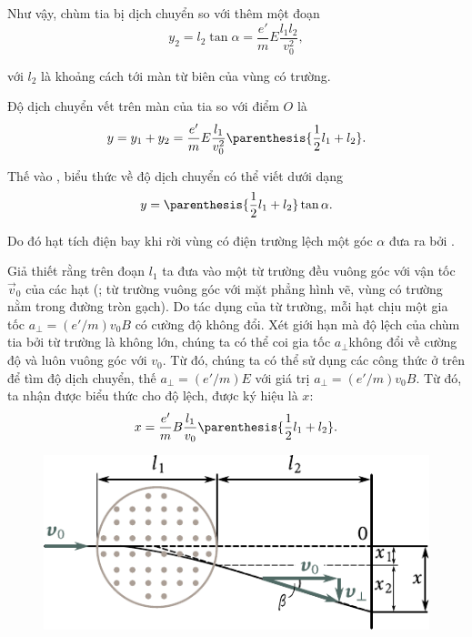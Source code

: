\noindent
Như vậy, chùm tia bị dịch chuyển so với  thêm một đoạn
\begin{equation*}
    y_2 = l_2 \tan\alpha = \frac{e'}{m} E \frac{l_1 l_2}{v_0^2},
\end{equation*}

\noindent
với $l_2$ là khoảng cách tới màn từ biên của vùng có trường.

Độ dịch chuyển vết trên màn của tia so với điểm $O$ là 
\begin{equation}\label{eq:10_7}
    y = y_1 + y_2 = \frac{e'}{m} E \frac{l_1}{v_0^2} \parenthesis{\frac{1}{2} l_1 + l_2}.
\end{equation}

\noindent
Thế vào , biểu thức về độ dịch chuyển có thể viết dưới dạng
\begin{equation*}
    y = \parenthesis{\frac{1}{2} l_1 + l_2} \tan\alpha.
\end{equation*}

\noindent
Do đó hạt tích điện bay khi rời vùng có điện trường lệch một góc $\alpha$ đưa ra bởi  .

Giả thiết rằng trên đoạn $l_1$ ta đưa vào một từ trường đều vuông góc với vận tốc $\vec{v}_0$ của các hạt (; từ trường vuông góc với mặt phẳng hình vẽ, vùng có trường nằm trong đường tròn gạch).
Do tác dụng của từ trường, mỗi hạt chịu một gia tốc $a_{\perp}=(e'/m)v_0B$ có cường độ không đổi.
Xét giới hạn mà độ lệch của chùm tia bởi từ trường là không lớn, chúng ta có thể coi gia tốc $a_{\perp}$không đổi về cường độ và luôn vuông góc với $v_0$.
Từ đó, chúng ta có thể sử dụng các công thức ở trên để tìm độ dịch chuyển, thế $a_{\perp}=(e'/m)E$ với giá trị $a_{\perp}=(e'/m)v_0B$.
Từ đó, ta nhận được biểu thức cho độ lệch, được ký hiệu là $x$:
\begin{equation}\label{eq:10_8}
    x = \frac{e'}{m} B \frac{l_1}{v_0} \parenthesis{\frac{1}{2} l_1 + l_2}.
\end{equation}

\begin{figure}[t]
	\begin{center}
		\includegraphics[scale=0.98]{figures/ch_10/fig_10_4.pdf}
		\caption[]{}
		\label{fig:10_4}
	\end{center}
	\vspace{-0.85cm}
\end{figure}

